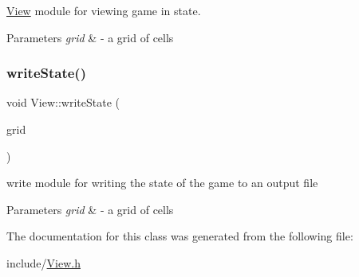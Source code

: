 \hyperlink{class_view}{View} module for viewing game in state. 


\begin{DoxyParams}{Parameters}
{\em grid} & -\/ a grid of cells \\
\hline
\end{DoxyParams}
\mbox{\label{class_view_ab0430cbaaf51bb6dbfff2ddc9fa63323}} 
\subsubsection{\texorpdfstring{write\+State()}{writeState()}}
{\footnotesize\ttfamily void View\+::write\+State (\begin{DoxyParamCaption}\item[{\hyperlink{_cell_grid_8h_a08e01c7715710423d2df780e67d447b4}{Cell\+Grid}}]{grid }\end{DoxyParamCaption})}



write module for writing the state of the game to an output file 


\begin{DoxyParams}{Parameters}
{\em grid} & -\/ a grid of cells \\
\hline
\end{DoxyParams}


The documentation for this class was generated from the following file\+:\begin{DoxyCompactItemize}
\item 
include/\hyperlink{_view_8h}{View.\+h}\end{DoxyCompactItemize}
